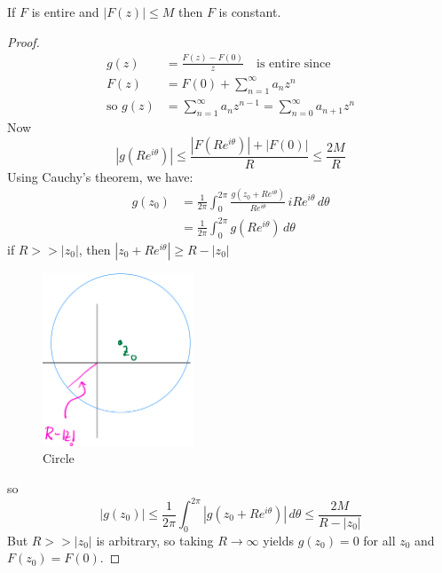 \begin{theorem}
    If $F$ is entire and $|F(z)| \leq M$ then $F$ is constant.
\end{theorem}

\begin{proof}
    \begin{align*}
        g(z)            & = \frac{F(z) - F(0)}{z} \quad \text{is entire since}                \\
        F(z)            & = F(0) + \sum_{n=1}^{\infty} a_n z^n                                \\
        \text{so } g(z) & = \sum_{n=1}^{\infty} a_n z^{n-1} = \sum_{n=0}^{\infty} a_{n+1} z^n
    \end{align*}
    Now
    \begin{equation*}
        |g(Re^{i\theta})| \leq \frac{|F(Re^{i\theta})| + |F(0)|}{R} \leq  \frac{2M}{R}
    \end{equation*}
    Using Cauchy's theorem, we have:
    \begin{align*}
        g(z_0) & = \frac{1}{2\pi} \int_{0}^{2\pi} \frac{g(z_0 + Re^{i\theta})}{Re^{i\theta}} \, iRe^{i\theta} \, d\theta \\
               & = \frac{1}{2\pi} \int_{0}^{2\pi} g(Re^{i\theta}) \, d\theta
    \end{align*}
    if $R >> |z_0|$, then $|z_0 + Re^{i\theta}| \geq R - |z_0|$
    \begin{figure}[H]
        \centering
        \includegraphics[width=0.4\textwidth]{./LECTURE_9/liouville.png}
        \caption{Circle}
        \label{fig:Circle}
    \end{figure}
    so
    \begin{equation*}
        |g(z_0)| \leq \frac{1}{2\pi} \int_0^{2\pi}|g(z_0 + Re^{i\theta})| \, d\theta \leq \frac{2M}{R-|z_0|}
    \end{equation*}
    But $R >> |z_0|$ is arbitrary, so taking $R \to \infty$ yields $g(z_0) = 0$ for all $z_0$ and $F(z_0) = F(0)$.
\end{proof}


